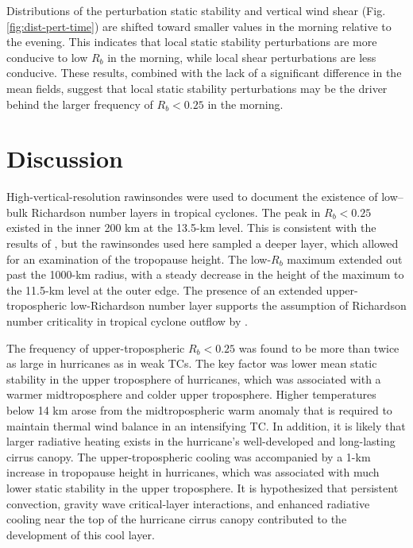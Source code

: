 Distributions of the perturbation static stability and vertical wind shear (Fig. \ref{fig:dist-pert-time}) are shifted toward smaller values in the morning relative to the evening.
This indicates that local static stability perturbations are more conducive to low $R_b$ in the morning, while local shear perturbations are less conducive.
These results, combined with the lack of a significant difference in the mean fields, suggest that local static stability perturbations may be the driver behind the larger frequency of $R_b < 0.25$ in the morning.

\section{Discussion}
\label{sec:discussion}

High-vertical-resolution rawinsondes were used to document the existence of low–bulk Richardson number layers in tropical cyclones.
The peak in $R_b < 0.25$ existed in the inner 200 km at the 13.5-km level.
This is consistent with the results of \cite{Molinarietal2014}, but the rawinsondes used here sampled a deeper layer, which allowed for an examination of the tropopause height.
The low-$R_b$ maximum extended out past the 1000-km radius, with a steady decrease in the height of the maximum to the 11.5-km level at the outer edge.
The presence of an extended upper-tropospheric low-Richardson number layer supports the assumption of Richardson number criticality in tropical cyclone outflow by \cite{EmanuelRotunno2011}.

The frequency of upper-tropospheric $R_b < 0.25$ was found to be more than twice as large in hurricanes as in weak TCs.
The key factor was lower mean static stability in the upper troposphere of hurricanes, which was associated with a warmer midtroposphere and colder upper troposphere.
Higher temperatures below 14 km arose from the midtropospheric warm anomaly that is required to maintain thermal wind balance in an intensifying TC.
In addition, it is likely that larger radiative heating exists in the hurricane’s well-developed and long-lasting cirrus canopy.
The upper-tropospheric cooling was accompanied by a 1-km increase in tropopause height in hurricanes, which was associated with much lower static stability in the upper troposphere.
It is hypothesized that persistent convection, gravity wave critical-layer interactions, and enhanced radiative cooling near the top of the hurricane cirrus canopy contributed to the development of this cool layer.

